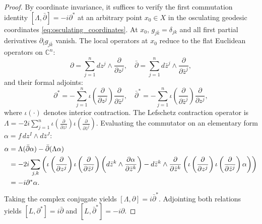 \documentclass[11pt,a4paper]{article}
\theoremstyle{definition}
\theoremstyle{plain}
\begin{document}
\begin{proof}
By coordinate invariance, it suffices to verify the first commutation identity $[\Lambda, \bar{\partial}] = -i \partial^*$ at an arbitrary point $x_0 \in X$ in the osculating geodesic coordinates \eqref{eq:osculating_coordinates}. At $x_0$, $g_{j\bar{k}} = \delta_{jk}$ and all first partial derivatives $\partial_l g_{j\bar{k}}$ vanish. The local operators at $x_0$ reduce to the flat Euclidean operators on $\mathbb{C}^n$:
\begin{equation}
    \partial = \sum_{j=1}^n dz^j \wedge \frac{\partial}{\partial z^j}, \quad \bar{\partial} = \sum_{j=1}^n d\bar{z}^j \wedge \frac{\partial}{\partial \bar{z}^j},
\end{equation}
and their formal adjoints:
\begin{equation}
    \partial^* = -\sum_{j=1}^n \iota\left(\frac{\partial}{\partial z^j}\right) \frac{\partial}{\partial \bar{z}^j}, \quad \bar{\partial}^* = -\sum_{j=1}^n \iota\left(\frac{\partial}{\partial \bar{z}^j}\right) \frac{\partial}{\partial z^j},
\end{equation}
where $\iota(\cdot)$ denotes interior contraction. The Lefschetz contraction operator is $\Lambda = -2i \sum_{j=1}^n \iota(\frac{\partial}{\partial z^j}) \iota(\frac{\partial}{\partial \bar{z}^j})$. Evaluating the commutator on an elementary form $\alpha = f \, dz^I \wedge d\bar{z}^J$:
\begin{align}
    [\Lambda, \bar{\partial}]\alpha &= \Lambda(\bar{\partial}\alpha) - \bar{\partial}(\Lambda\alpha) \notag \\
    &= -2i \sum_{j,k} \left( \iota\left(\frac{\partial}{\partial z^j}\right) \iota\left(\frac{\partial}{\partial \bar{z}^j}\right) \left( d\bar{z}^k \wedge \frac{\partial\alpha}{\partial \bar{z}^k} \right) - d\bar{z}^k \wedge \frac{\partial}{\partial \bar{z}^k} \left( \iota\left(\frac{\partial}{\partial z^j}\right) \iota\left(\frac{\partial}{\partial \bar{z}^j}\right)\alpha \right) \right) \notag \\
    &= -i \partial^* \alpha.
\end{align}
Taking the complex conjugate yields $[\Lambda, \partial] = i \bar{\partial}^*$. Adjointing both relations yields $[L, \partial^*] = i \bar{\partial}$ and $[L, \bar{\partial}^*] = -i \partial$.


\end{proof}
\end{document}
